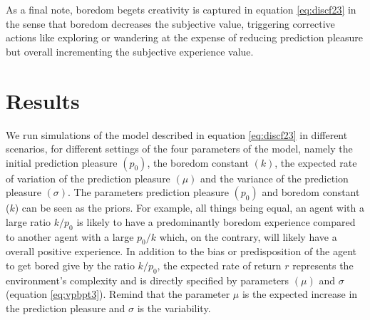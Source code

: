 \documentclass[11pt, onecolumn]{article}
\begin{document}
As a final note, boredom begets creativity is captured in equation \ref{eq:discf23} in the sense that boredom decreases the subjective value, triggering corrective actions like exploring or wandering at the expense of reducing prediction pleasure but overall incrementing the subjective experience value.

\section{Results}
\label{se:re}

We run simulations of the model described in equation \ref{eq:discf23} in different scenarios, for different settings of the four parameters of the model, namely the initial prediction pleasure $(p_0)$, the boredom constant $(k)$, the expected rate of variation of the prediction pleasure $(\mu)$ and the variance of the prediction pleasure $(\sigma)$. The parameters prediction pleasure $(p_0)$ and boredom constant ($k$) can be seen as the priors. For example, all things being equal, an agent with a large ratio $k/p_0$ is likely to have a predominantly boredom experience compared to another agent with a large $p_0/k$ which, on the contrary, will likely have a overall positive experience. In addition to the bias or predisposition of the agent to get bored give by the ratio $k/p_0$, the expected rate of return $r$ represents the environment's complexity and is directly specified by parameters $(\mu)$ and $\sigma$ (equation \ref{eq:vpbpt3}). Remind that the parameter $\mu$ is the expected increase in the prediction pleasure and $\sigma$ is the variability.
\end{document}
